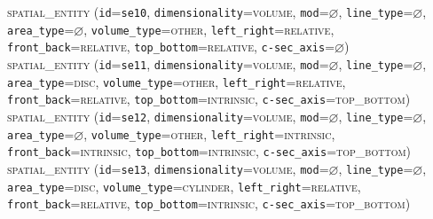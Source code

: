 \documentclass[11pt]{article}
\begin{document}
{        \textsc{spatial\_entity}
            (\texttt{id}=\texttt{se10},
            \texttt{dimensionality}=\textsc{volume},
            \texttt{mod}=$\varnothing$,
            \texttt{line\_type}=$\varnothing$,\\
            \texttt{area\_type}=$\varnothing$,
            \texttt{volume\_type}=\textsc{other},
            \texttt{left\_right}=\textsc{relative},\\
            \texttt{front\_back}=\textsc{relative},
            \texttt{top\_bottom}=\textsc{relative},
            \texttt{c-sec\_axis}=$\varnothing$)\vspace{0.5em}\\
        \textsc{spatial\_entity}
            (\texttt{id}=\texttt{se11},
            \texttt{dimensionality}=\textsc{volume},
            \texttt{mod}=$\varnothing$,
            \texttt{line\_type}=$\varnothing$,\\
            \texttt{area\_type}=\textsc{disc},
            \texttt{volume\_type}=\textsc{other},
            \texttt{left\_right}=\textsc{relative},\\
            \texttt{front\_back}=\textsc{relative},
            \texttt{top\_bottom}=\textsc{intrinsic},
            \texttt{c-sec\_axis}=\textsc{top\_bottom})\vspace{0.5em}\\
        \textsc{spatial\_entity}
            (\texttt{id}=\texttt{se12},
            \texttt{dimensionality}=\textsc{volume},
            \texttt{mod}=$\varnothing$,
            \texttt{line\_type}=$\varnothing$,\\
            \texttt{area\_type}=$\varnothing$,
            \texttt{volume\_type}=\textsc{other},
            \texttt{left\_right}=\textsc{intrinsic},\\
            \texttt{front\_back}=\textsc{intrinsic},
            \texttt{top\_bottom}=\textsc{intrinsic},
            \texttt{c-sec\_axis}=\textsc{top\_bottom})\vspace{0.5em}\\
        \textsc{spatial\_entity}
            (\texttt{id}=\texttt{se13},
            \texttt{dimensionality}=\textsc{volume},
            \texttt{mod}=$\varnothing$,
            \texttt{line\_type}=$\varnothing$,\\
            \texttt{area\_type}=\textsc{disc},
            \texttt{volume\_type}=\textsc{cylinder},
            \texttt{left\_right}=\textsc{relative},\\
            \texttt{front\_back}=\textsc{relative},
            \texttt{top\_bottom}=\textsc{intrinsic},
            \texttt{c-sec\_axis}=\textsc{top\_bottom})\vspace{0.5em}\\
    \label{ex:table_flowers_etc}
}\label{ex:spatial_entity}
\end{document}

